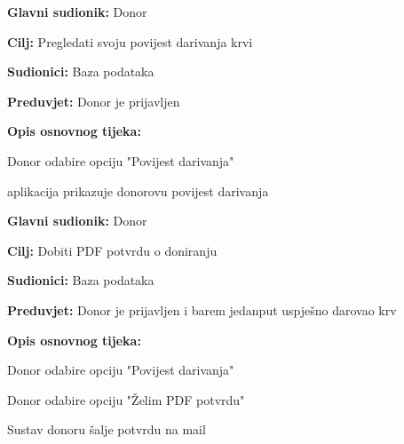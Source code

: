 \documentclass[11pt]{book}
\begin{document}
					\begin{packed_item}
	
						\item \textbf{Glavni sudionik: }Donor
						\item \textbf{Cilj:} Pregledati svoju povijest darivanja krvi
						\item \textbf{Sudionici:} Baza podataka
						\item \textbf{Preduvjet:} Donor je prijavljen
						\item \textbf{Opis osnovnog tijeka:}
						
						\item[] \begin{packed_enum}
	
							\item Donor odabire opciju "Povijest darivanja"
							\item aplikacija prikazuje donorovu povijest darivanja
							
						\end{packed_enum}

					\end{packed_item}

\noindent {}
					\begin{packed_item}
	
						\item \textbf{Glavni sudionik: }Donor
						\item \textbf{Cilj:} Dobiti PDF potvrdu o doniranju
						\item \textbf{Sudionici:} Baza podataka
						\item \textbf{Preduvjet:} Donor je prijavljen i barem jedanput uspješno darovao krv
						\item \textbf{Opis osnovnog tijeka:}
						
						\item[] \begin{packed_enum}
	
							\item Donor odabire opciju "Povijest darivanja"
							\item Donor odabire opciju "Želim PDF potvrdu"
							\item Sustav donoru šalje potvrdu na mail
							
						\end{packed_enum}

					\end{packed_item}
\end{document}
